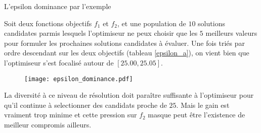 \begin{testiv}{L'epsilon dominance par l'exemple}{}

Soit deux fonctions objectifs $f_1$ et $f_2$, et une population de $10$ solutions candidates parmis lesquels l'optimiseur ne peux choisir que les $5$ meilleurs valeurs pour formuler les prochaines solutions candidates à évaluer. Une fois triés par ordre descendant sur les deux objectifs (tableau \ref{epsilon_a}), on vient bien que l'optimiseur s'est focalisé autour de $[25.00,25.05]$. 

\begin{figure}[H]
	 \centering
	 	\texttt{[image: epsilon\_dominance.pdf]}
	 	\label{fig:epsilon}
\end{figure}

La diversité à ce niveau de résolution doit paraître suffisante à l'optimiseur pour qu'il continue à selectionner des candidats proche de $25$. Mais le gain est vraiment trop minime et cette pression sur $f_{2}$ masque peut être l'existence de meilleur compromis ailleurs. 

\begin{table}[H]
	\centering
		\begin{minipage}{0.4\textwidth}
			\centering
		 \end{minipage}\hspace{0.2em}
		 \begin{minipage}{0.4\textwidth}
			\centering
		\end{minipage}
\end{table}


\end{testiv}

